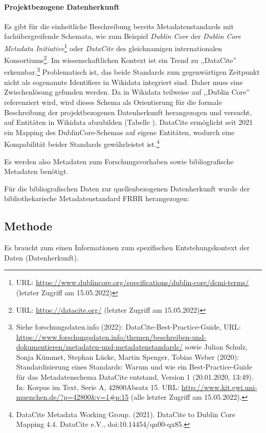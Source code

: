 \paragraph{Projektbezogene Datenherkunft} Es gibt für die einheitliche Beschreibung bereits Metadatenstandards mit fachübergreifende Schemata, wie zum Beispiel \textit{Dublin Core} der \textit{Dublin Core Metadata Initiative}\footnote{URL: \url{https://www.dublincore.org/specifications/dublin-core/dcmi-terms/} (letzter Zugriff am 15.05.2022)} oder \textit{DataCite} des gleichnamigen internationalen Konsortiums\footnote{URL: \url{https://datacite.org/} (letzter Zugriff am 15.05.2022)}. Im wissenschaftlichen Kontext ist ein Trend zu ,,DataCite'' erkennbar.\footnote{Siehe forschungsdaten.info (2022): DataCite-Best-Practice-Guide, URL: \url{https://www.forschungsdaten.info/themen/beschreiben-und-dokumentieren/metadaten-und-metadatenstandards/} sowie Julian Schulz, Sonja Kümmet, Stephan Lücke, Martin Spenger, Tobias Weber (2020): Standardisierung eines Standards: Warum und wie ein Best-Practice-Guide für das Metadatenschema DataCite entstand, Version 1 (20.01.2020, 13:49). In: Korpus im Text, Serie A, 42800Absatz 15. URL: \url{http://www.kit.gwi.uni-muenchen.de/?p=42800&v=1\#p:15} (alle letzter Zugriff am 15.05.2022).} Problematisch ist, das beide Standards zum gegenwärtigen Zeitpunkt nicht als sogenannte Identifiers in Wikidata integriert sind. Daher muss eine Zwischenlösung gefunden werden. Da in Wikidata teilweise auf ,,Dublin Core'' referenziert wird, wird dieses Schema als Orientierung für die formale Beschreibung der projektbezogenen Datenherkunft herangezogen und versucht, auf Entitäten in Wikidata abzubilden (Tabelle ). DataCite ermöglicht seit 2021 ein Mapping des DublinCore-Schemas auf eigene Entitäten, wodurch eine Kompabilität beider Standards gewährleistet ist.\footnote{DataCite Metadata Working Group. (2021). DataCite to Dublin Core Mapping 4.4. DataCite e.V., doi:10.14454/qn00-qx85.}


Es werden also Metadaten zum Forschungsvorhaben sowie bibliografische Metadaten benötigt.

Für die bibliografischen Daten zur quellenbezogenen Datenherkunft wurde der bibliothekarische Metadatenstandard FRBR herangezogen:

\subsection{Methode}



Es braucht zum einen Informationen zum spezifischen Entstehungskontext der Daten (Datenherkunft). 

